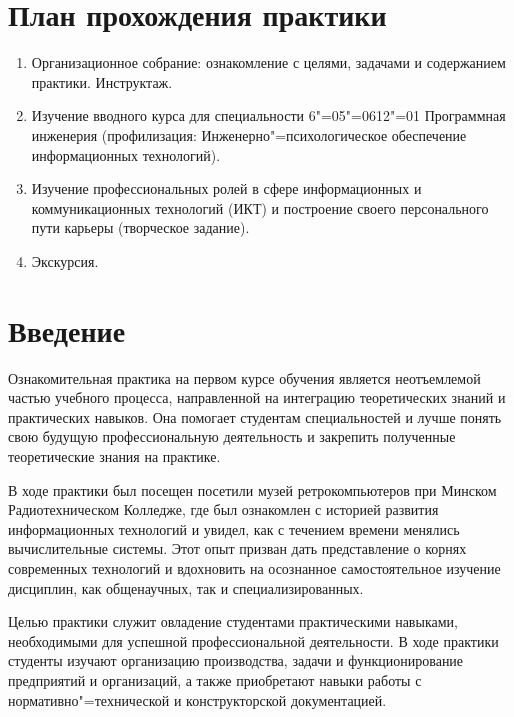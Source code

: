 \documentclass[variant=practice]{bsuir}
\begin{document}
\maketitle

\chapter*{План прохождения практики}

\begin{enumerate}
      \item Организационное собрание: ознакомление с целями, задачами и
            содержанием практики. Инструктаж.
      \item Изучение вводного курса  для
            специальности 6"=05"=0612"=01 Программная инженерия (профилизация:
            Инженерно"=психологическое обеспечение информационных технологий).
      \item Изучение профессиональных ролей в сфере информационных и
            коммуникационных технологий (ИКТ) и построение своего персонального
            пути карьеры (творческое задание).
      \item Экскурсия.
\end{enumerate}

\maketoc*

\chapter*{Введение}


Ознакомительная практика на первом курсе обучения является неотъемлемой частью
учебного процесса, направленной на интеграцию теоретических знаний и
практических навыков. Она помогает студентам специальностей
 и  лучше понять свою будущую профессиональную деятельность и закрепить
полученные теоретические знания на практике.

В ходе практики был посещен посетили музей ретрокомпьютеров
\textit{} при Минском Радиотехническом Колледже, где был
ознакомлен с историей развития информационных технологий и увидел, как с
течением времени менялись вычислительные системы. Этот опыт призван дать
представление о корнях современных технологий и вдохновить на осознанное
самостоятельное изучение дисциплин, как общенаучных, так и специализированных.

Целью практики служит овладение студентами практическими навыками, необходимыми
для успешной профессиональной деятельности. В ходе практики студенты изучают
организацию производства, задачи и функционирование предприятий и организаций, а
также приобретают навыки работы с нормативно"=технической и конструкторской
документацией.
\end{document}
